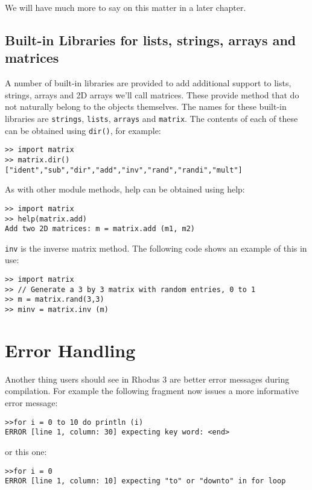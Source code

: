 We will have much more to say on this matter in a later chapter.

\subsection{Built-in Libraries for lists, strings, arrays and matrices}

A number of built-in libraries are provided to add additional support to lists, strings, arrays and 2D arrays we'll call matrices. These provide method that do not naturally belong to the objects themselves. The names for these built-in libraries are {\tt strings}, {\tt lists}, {\tt arrays} and {\tt matrix}. The contents of each of these can be obtained using {\tt dir()}, for example:

\begin{lstlisting}
>> import matrix
>> matrix.dir()
["ident","sub","dir","add","inv","rand","randi","mult"]
\end{lstlisting}

As with other module methods, help can be obtained using help:

\begin{lstlisting}
>> import matrix
>> help(matrix.add)
Add two 2D matrices: m = matrix.add (m1, m2)
\end{lstlisting}

{\tt inv} is the inverse matrix method. The following code shows an example of this in use:

\begin{lstlisting}
>> import matrix
>> // Generate a 3 by 3 matrix with random entries, 0 to 1
>> m = matrix.rand(3,3)
>> minv = matrix.inv (m)
\end{lstlisting}

\section{Error Handling}

Another thing users should see in Rhodus 3 are better error messages during compilation. For example the following fragment now issues a more informative error message:

\begin{lstlisting}
>>for i = 0 to 10 do println (i)
ERROR [line 1, column: 30] expecting key word: <end>
\end{lstlisting}

or this one:

\begin{lstlisting}
>>for i = 0
ERROR [line 1, column: 10] expecting "to" or "downto" in for loop
\end{lstlisting}

